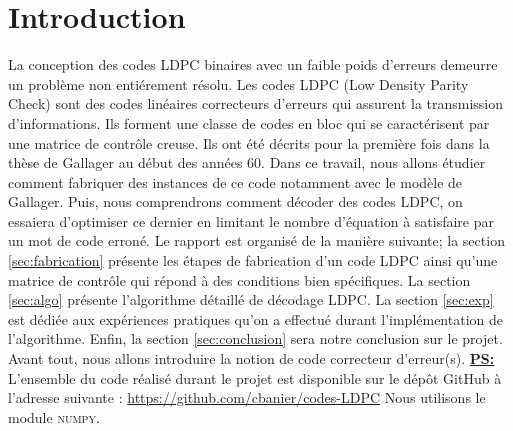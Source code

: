 \documentclass[french,nochapter,11pt]{rapportUB}
\begin{document}
\section{Introduction}
\label{sec:introduction}
La conception des codes LDPC binaires avec un faible poids d'erreurs demeurre un problème non entiérement résolu. 
Les codes LDPC (Low Density Parity Check) sont des codes linéaires correcteurs d'erreurs qui assurent la transmission d'informations. 
Ils forment une classe de codes en bloc qui se caractérisent par une matrice de contrôle creuse. Ils ont été décrits pour la première 
fois dans la thèse de Gallager au début des années 60. Dans ce travail, nous allons étudier comment fabriquer des instances de ce code 
notamment avec le modèle de Gallager. Puis, nous comprendrons comment décoder des codes LDPC, on essaiera d'optimiser ce dernier en limitant
le nombre d'équation à satisfaire par un mot de code erroné.\vspace{0.4cm}\newline
Le rapport est organisé de la manière suivante; la section \ref{sec:fabrication} présente les étapes de fabrication d'un code LDPC 
ainsi qu'une matrice de contrôle qui répond à des conditions bien spécifiques. La section \ref{sec:algo} présente l'algorithme 
détaillé de décodage LDPC. La section \ref{sec:exp} est dédiée aux expériences pratiques qu'on a effectué durant l'implémentation 
de l'algorithme. Enfin, la section \ref{sec:conclusion} sera notre conclusion sur le projet.\vspace{0.4cm}\newline
Avant tout, nous allons introduire la notion de code correcteur d'erreur(s).\vspace{0.7cm}\newline
\textbf{\underline{PS:}} L'ensemble du code réalisé durant le projet est disponible sur le dépôt GitHub à l'adresse suivante : \url{https://github.com/cbanier/codes-LDPC}
\newline Nous utilisons le module \textsc{numpy}.
\clearpage

\end{document}
